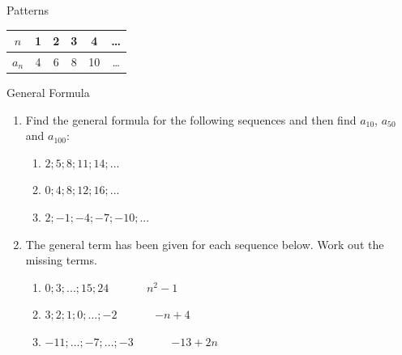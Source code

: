 \begin{exercises}{Patterns }
\begin{center}
\begin{tabular}{|c|c|c|c|c|c|}
\hline $n$ & 1 & 2 & 3 & 4 & \ldots \\
\hline $a_n$ & 4 & 6 & 8 & 10 & \ldots \\
\hline
\end{tabular}
\end{center}
\label{m39362*secfhsst!!!underscore!!!id1060}
          \begin{exercises}{General Formula }
           { \nopagebreak
      \label{m39362*id65612}\begin{enumerate}[noitemsep, label=\textbf{\arabic*}. ] 
            \label{m39362*uid17}\item Find the general formula for the following sequences and then find ${a}_{10}$, ${a}_{50}$ and ${a}_{100}$:
\label{m39362*id65671}\begin{enumerate}[noitemsep, label=\textbf{\alph*}. ] 
            \label{m39362*uid18}\item $2;5;8;11;14;...$\label{m39362*uid19}\item $0;4;8;12;16;...$\label{m39362*uid20}\item $2;-1;-4;-7;-10;...$\end{enumerate}
        \label{m39362*uid21}\item The general term has been given for each sequence below. Work out the missing terms.
\label{m39362*id65820}\begin{enumerate}[noitemsep, label=\textbf{\alph*}. ] 
            \label{m39362*uid22}\item $0;3;...;15;24$ ~~~~~~${n}^{2}-1$\label{m39362*uid23}\item $3;2;1;0;...;-2$ ~~~~~~$-n+4$\label{m39362*uid24}\item $-11;...;-7;...;-3$ ~~~~~~$-13+2n$\end{enumerate}
        \end{enumerate}}
      \label{m39362*uid25}

\end{exercises}
\end{exercises}
